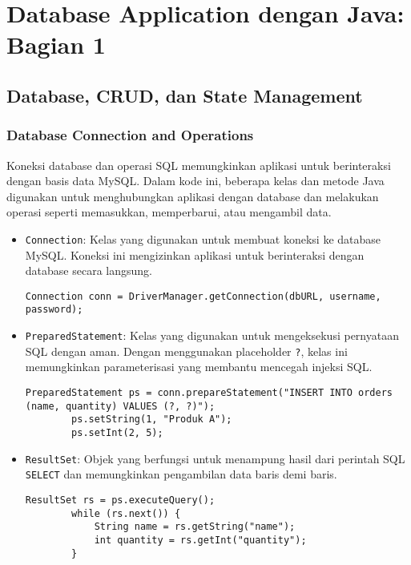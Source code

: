 \chapter{Database Application dengan Java: Bagian 1}

\section{Database, CRUD, dan State Management}

\subsection{Database Connection and Operations}

Koneksi database dan operasi SQL memungkinkan aplikasi untuk berinteraksi dengan basis data MySQL. Dalam kode ini, beberapa kelas dan metode Java digunakan untuk menghubungkan aplikasi dengan database dan melakukan operasi seperti memasukkan, memperbarui, atau mengambil data.

\begin{itemize}
	\item \texttt{Connection}: Kelas yang digunakan untuk membuat koneksi ke database MySQL. Koneksi ini mengizinkan aplikasi untuk berinteraksi dengan database secara langsung.
	\begin{lstlisting}[style=JavaStyle]
		Connection conn = DriverManager.getConnection(dbURL, username, password);
	\end{lstlisting}
	
	\item \texttt{PreparedStatement}: Kelas yang digunakan untuk mengeksekusi pernyataan SQL dengan aman. Dengan menggunakan placeholder \texttt{?}, kelas ini memungkinkan parameterisasi yang membantu mencegah injeksi SQL.
	\begin{lstlisting}[style=JavaStyle]
		PreparedStatement ps = conn.prepareStatement("INSERT INTO orders (name, quantity) VALUES (?, ?)");
		ps.setString(1, "Produk A");
		ps.setInt(2, 5);
	\end{lstlisting}
	
	\item \texttt{ResultSet}: Objek yang berfungsi untuk menampung hasil dari perintah SQL \texttt{SELECT} dan memungkinkan pengambilan data baris demi baris.
	\begin{lstlisting}[style=JavaStyle]
		ResultSet rs = ps.executeQuery();
		while (rs.next()) {
			String name = rs.getString("name");
			int quantity = rs.getInt("quantity");
		}
	\end{lstlisting}
\end{itemize}

